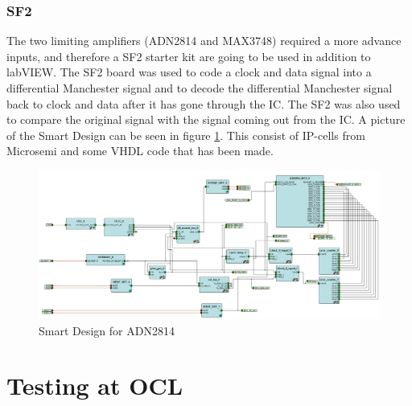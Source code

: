 \documentclass[12pt]{article}
\numberwithin{figure}{section}
\begin{document}
\subsubsection{\acf{SF2}}
The two limiting amplifiers (ADN2814 and MAX3748) required a more advance inputs, and therefore a \acf{SF2} starter kit are going to be used in addition to labVIEW.
The \ac{SF2} board was used to code a clock and data signal into a differential Manchester signal and to decode the differential Manchester signal back to clock and data after it has gone through the IC.
The \ac{SF2} was also used to compare the original signal with the signal coming out from the IC.
A picture of the Smart Design can be seen in figure \ref{SF2}. This consist of IP-cells from Microsemi and some VHDL code that has been made.

\begin{figure}[!htbp]
  \centering
  \includegraphics[width=1.5\textwidth, angle =270]{vhdl_adn.png}
  \caption{Smart Design for ADN2814}
  \label{SF2}
\end{figure}

\FloatBarrier

\section{Testing at \acf{OCL}}
\end{document}
